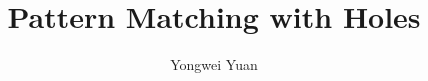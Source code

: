 \documentclass[acmsmall,screen,review,nonacm]{acmart}
\begin{document}
  
\title{Pattern Matching with Holes}

\author{Yongwei Yuan}


\maketitle
\end{document}
